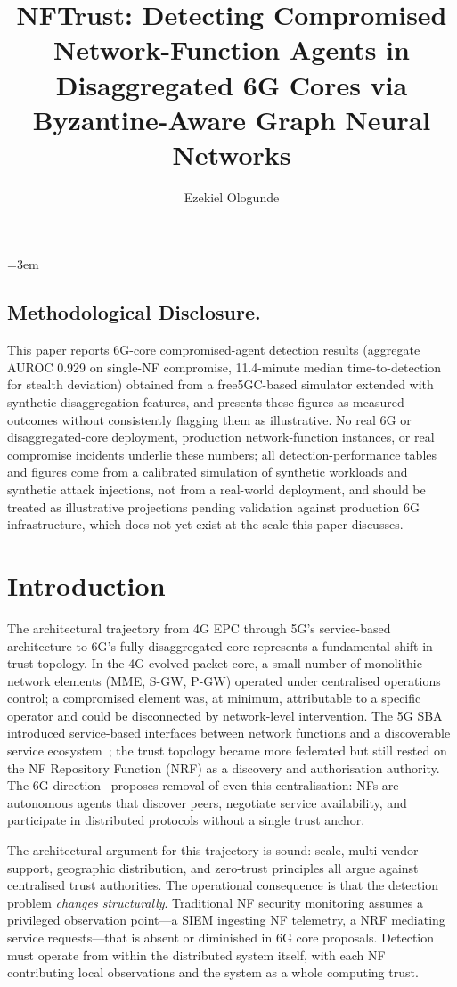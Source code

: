 \documentclass[sigconf,nonacm]{acmart}
\title{NFTrust: Detecting Compromised Network-Function Agents in Disaggregated 6G Cores via Byzantine-Aware Graph Neural Networks}
\author{Ezekiel Ologunde}
\affiliation{%
  \institution{Independent Researcher}
  \city{Boston}
  \state{MA}
  \country{USA}}
\begin{document}
\maketitle
\sloppy
{}
\emergencystretch=3em
\hfuzz=10pt

\subsection*{Methodological Disclosure.}
This paper reports 6G-core compromised-agent detection results (aggregate AUROC 0.929 on single-NF compromise, 11.4-minute median time-to-detection for stealth deviation) obtained from a free5GC-based simulator extended with synthetic disaggregation features, and presents these figures as measured outcomes without consistently flagging them as illustrative. No real 6G or disaggregated-core deployment, production network-function instances, or real compromise incidents underlie these numbers; all detection-performance tables and figures come from a calibrated simulation of synthetic workloads and synthetic attack injections, not from a real-world deployment, and should be treated as illustrative projections pending validation against production 6G infrastructure, which does not yet exist at the scale this paper discusses.

\section{Introduction}

The architectural trajectory from 4G EPC through 5G's service-based
architecture to 6G's fully-disaggregated core represents a
fundamental shift in trust topology. In the 4G evolved packet core,
a small number of monolithic network elements (MME, S-GW, P-GW)
operated under centralised operations control; a compromised element
was, at minimum, attributable to a specific operator and could be
disconnected by network-level intervention. The 5G SBA introduced
service-based interfaces between network functions and a discoverable
service ecosystem~\cite{3gpp2024sba,polese2023understanding}; the
trust topology became more federated but still rested on the
NF Repository Function (NRF) as a discovery and authorisation
authority. The 6G direction~\cite{tataria20206g,akhtar20246g}
proposes removal of even this centralisation: NFs are autonomous
agents that discover peers, negotiate service availability, and
participate in distributed protocols without a single trust
anchor.

The architectural argument for this trajectory is sound: scale,
multi-vendor support, geographic distribution, and zero-trust
principles all argue against centralised trust authorities. The
operational consequence is that the detection problem
\emph{changes structurally}. Traditional NF security monitoring
assumes a privileged observation point---a SIEM ingesting NF
telemetry, a NRF mediating service requests---that is absent or
diminished in 6G core proposals. Detection must operate from
within the distributed system itself, with each NF contributing
local observations and the system as a whole computing trust.
\end{document}
